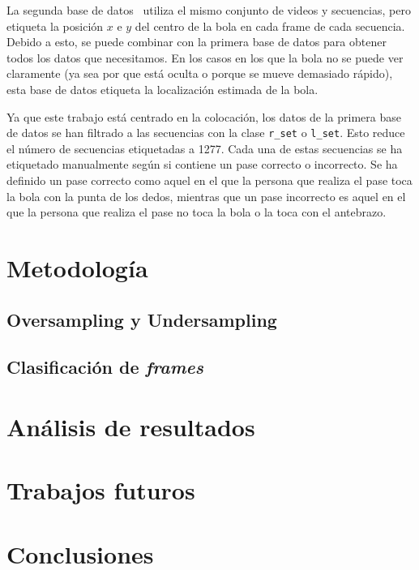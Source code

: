 \documentclass[12pt]{report} %
\begin{document}
    La segunda base de datos~\cite{dataset2} utiliza el mismo conjunto de videos y secuencias,
    pero etiqueta la posición $x$ e $y$ del centro de la bola en cada frame de
    cada secuencia. Debido a esto, se puede combinar con la primera base de
    datos para obtener todos los datos que necesitamos. En los casos en los que
    la bola no se puede ver claramente (ya sea por que está oculta o porque se
    mueve demasiado rápido), esta base de datos etiqueta la localización
    estimada de la bola.

    Ya que este trabajo está centrado en la colocación, los datos de la primera base
    de datos se han filtrado a las secuencias con la clase \verb!r_set! o
    \verb!l_set!. Esto reduce el número de secuencias etiquetadas a 1277. Cada
    una de estas secuencias se ha etiquetado manualmente según si contiene un
    pase correcto o incorrecto. Se ha definido un pase correcto como aquel en el
    que la persona que realiza el pase toca la bola con la punta de los dedos,
    mientras que un pase incorrecto es aquel en el que la persona que realiza el
    pase no toca la bola o la toca con el antebrazo.

    \chapter{Metodología}
    \label{chap:metodologia}

    \section{Oversampling y Undersampling}

    \section{Clasificación de \textit{frames}}

    \chapter{Análisis de resultados}
    \label{chap:resultados}

    \chapter{Trabajos futuros}
    \label{chap:future}

    \chapter{Conclusiones}
    \label{chap:conclusion}
\end{document}
